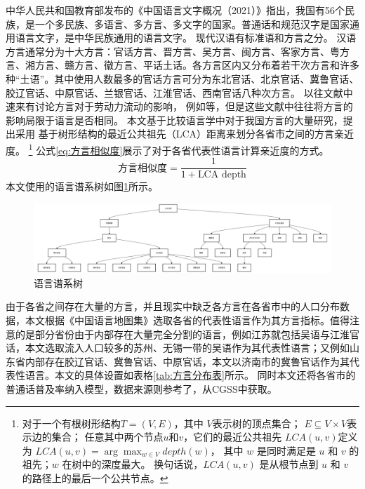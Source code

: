 \documentclass[a4paper,12pt,oneside, fontset=mac]{ctexbook} %
\begin{document}
中华人民共和国教育部发布的《中国语言文字概况（2021）》指出，我国有56个民族，是一个多民族、多语言、多方言、多文字的国家。普通话和规范汉字是国家通用语言文字，是中华民族通用的语言文字。
现代汉语有标准语和方言之分。
汉语方言通常分为十大方言：官话方言、晋方言、吴方言、闽方言、客家方言、粤方言、湘方言、赣方言、徽方言、平话土话。各方言区内又分布着若干次方言和许多种“土语”。其中使用人数最多的官话方言可分为东北官话、北京官话、冀鲁官话、胶辽官话、中原官话、兰银官话、江淮官话、西南官话八种次方言。
以往文献中速来有讨论方言对于劳动力流动的影响，
例如\cite{HuangZongYeFangYanDuiShengJiRenKouQianYiDeYingXiang2020,LiQinFangYanPuTongHuaYuZhongGuoLaoDongLiQuYuLiuDong2014}等，但是这些文献中往往将方言的影响局限于语言是否相同。
本文基于比较语言学中对于我国方言的大量研究，提出采用
基于树形结构的最近公共祖先（LCA）距离来划分各省市之间的方言亲近度。
\footnote{
对于一个有根树形结构$T=(V,E)$，其中
$V$表示树的顶点集合；
$E\subseteq V \times V$表示边的集合；
任意其中两个节点$u$和$v$，它们的最近公共祖先 $LCA(u,v) $定义为
$LCA(u,v)=\arg \max_{w\in V} depth(w)$，
其中 $w$ 是同时满足是 $u$ 和 $v$ 的祖先；$w$ 在树中的深度最大。
换句话说，$LCA(u,v)$ 是从根节点到 $u$ 和 $v$ 的路径上的最后一个公共节点。
}
公式\ref{eq:方言相似度}展示了对于各省代表性语言计算亲近度的方式。
\begin{equation}
  \label{eq:方言相似度}
  \text{方言相似度}=\frac{1}{1+\text{LCA depth}}
\end{equation}
本文使用的语言谱系树如图\ref{fig:linguistic_tree}所示。
\begin{figure}[!ht]
\centering
\caption{语言谱系树}
\label{fig:linguistic_tree}
\includegraphics[width=\textwidth]{images/linguisitc_tree.drawio.pdf}
\end{figure}
由于各省之间存在大量的方言，并且现实中缺乏各方言在各省市中的人口分布数据，本文根据《中国语言地图集》选取各省的代表性语言作为其方言指标。值得注意的是部分省份由于内部存在大量完全分割的语言，例如江苏就包括吴语与江淮官话，本文选取流入人口较多的苏州、无锡一带的吴语作为其代表性语言；又例如山东省内部存在胶辽官话、冀鲁官话、中原官话，本文以济南市的冀鲁官话作为其代表性语言。本文的具体设置如表格\ref{tab:方言分布表}所示。
同时本文还将各省市的普通话普及率纳入模型，数据来源则参考了\cite{YuWeiQiGuoMinPuTongHuaNengLiDeJiBenZhuangKuangYuFaZhanTaiShi2018}，从CGSS中获取。
\end{document}
